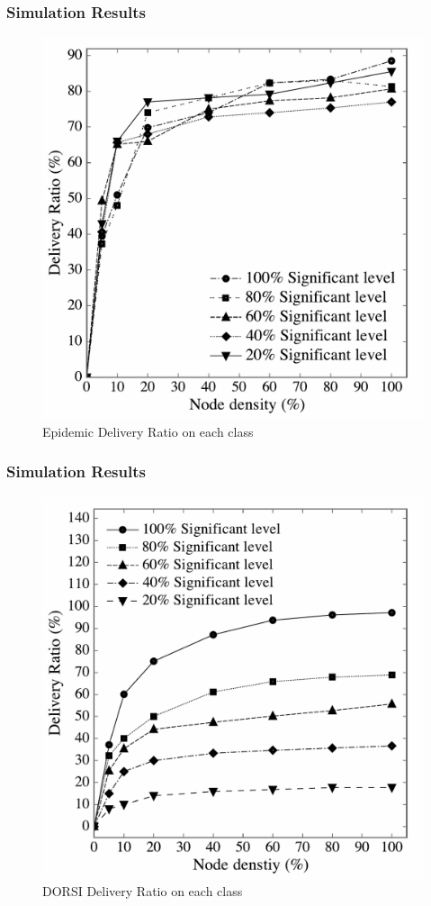 \documentclass{beamer}
\begin{document}

\begin{frame}
	\frametitle{Simulation Results}
\begin{figure}
\centering
\includegraphics[width=0.5\linewidth]{Figures_Present/Fig7-eps-converted-to}
\caption{Epidemic Delivery Ratio on each class}
\label{fig:Fig7-eps-converted-to}
\end{figure}
\end{frame}
\begin{frame}
	\frametitle{Simulation Results}
\begin{figure}
\centering
\includegraphics[width=0.5\linewidth]{Figures_Present/Fig6-eps-converted-to}
\caption{DORSI Delivery Ratio on each class}
\label{fig:Fig6-eps-converted-to}
\end{figure}
\end{frame}
\end{document}
